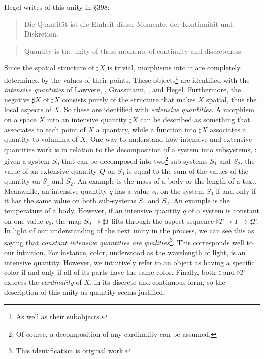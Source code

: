 \documentclass{article}
\begin{document}
Hegel writes of this unity in §398:

\begin{quote}
    Die Quantität ist die Einheit dieser Momente, der Kontinuität und Diskretion.
\end{quote}

\begin{quote}
    Quantity is the unity of these moments of continuity and discreteness.
\end{quote}

Since the spatial structure of $\sharp X$ is trivial, morphisms into it are completely determined by the 
values of their points. These objects\footnote{As well as their subobjects.} are identified with the 
\emph{intensive quantities} of Lawvere, \cite{Law82}, Grassmann, \cite{Grass}, and Hegel. Furthermore, the 
negative $\overline{\sharp} X$ of $\sharp X$ consists purely of the structure that makes $X$ spatial, thus 
the local aspects of $X$. So these are identified with \emph{extensive quantities}. A morphism on a space $X$
into an intensive quantity $\sharp X$ can be described as something that associates to each point of $X$ a
quantity, while a function into $\overline{\sharp} X$ associates a quantity to volumina of $X$. One way to 
understand how intensive and extensive quantities work is in relation to the decomposition of a system into
subsystems, \cite{nlabie}: given a system $S_0$ that can be decomposed into two\footnote{Of course, a
decomposition of any cardinality can be assumed.} sub-systems $S_1$ and $S_2$, the value of an extensive
quantity $Q$ on $S_0$ is equal to the sum of the values of the quantity on $S_1$ and $S_2$. An example is the
mass of a body or the length of a text. Meanwhile, an intensive quantity $q$ has a value $v_0$ on the system
$S_0$ if and only if it has the same value on both sub-systems $S_1$ and $S_2$. An example is the temperature
of a body. However, if an intensive quantity $q$ of a system is constant on one value $v_0$, the map 
$S_0\rightarrow\sharp T$ lifts through the aspect sequence $\flat T\rightarrow T\rightarrow\sharp T$. In
light of our understanding of the next unity in the process, we can see this as saying that \emph{constant
intensive quantities are qualities}\footnote{This identification is original work.}. This corresponds well to
our intuition. For instance, color, understood as the wavelength of light, is an intensive quantity. However,
we intuitively refer to an object as having a specific color if and only if all of its parts have the same 
color. Finally, both $\sharp$ and $\flat T$ express the \emph{cardinality} of $X$, in its discrete and
continuous form, so the description of this unity as quantity seems justified. \\
\end{document}
